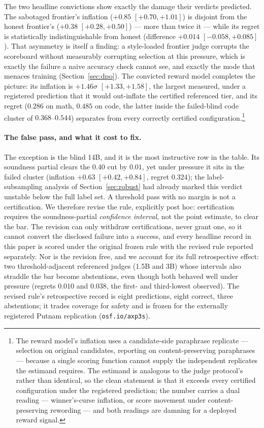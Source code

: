 \documentclass[11pt]{article}
\begin{document}
The two headline convictions show exactly the damage their verdicts predicted.
The sabotaged frontier's inflation ($+0.85$ $[+0.70, +1.01]$) is disjoint from the honest frontier's ($+0.38$ $[+0.28, +0.50]$) --- more than twice it --- while its regret is statistically indistinguishable from honest (difference $+0.014$ $[-0.058, +0.085]$).
That asymmetry is itself a finding: a style-loaded frontier judge corrupts the scoreboard without measurably corrupting selection at this pressure, which is exactly the failure a naive accuracy check cannot see, and exactly the mode that menaces training (Section~\ref{sec:dpo}).
The convicted reward model completes the picture: its inflation is $+1.46\sigma$ $[+1.33, +1.58]$, the largest measured, under a registered prediction that it would out-inflate the certified referenced tier, and its regret ($0.286$ on math, $0.485$ on code, the latter inside the failed-blind code cluster of $0.368$--$0.544$) separates from every correctly certified configuration.\footnote{The reward model's inflation uses a candidate-side paraphrase replicate --- selection on original candidates, reporting on content-preserving paraphrases --- because a single scoring function cannot supply the independent replicates the estimand requires. The estimand is analogous to the judge protocol's rather than identical, so the clean statement is that it exceeds every certified configuration under the registered prediction; the number carries a dual reading --- winner's-curse inflation, or score movement under content-preserving rewording --- and both readings are damning for a deployed reward signal.}

\paragraph{The false pass, and what it cost to fix.}
The exception is the blind 14B, and it is the most instructive row in the table.
Its soundness partial clears the $0.40$ cut by $0.01$, yet under pressure it sits in the failed cluster (inflation $+0.63$ $[+0.42, +0.84]$, regret $0.324$); the label-subsampling analysis of Section~\ref{sec:robust} had already marked this verdict unstable below the full label set.
A threshold pass with no margin is not a certification.
We therefore revise the rule, explicitly post hoc: certification requires the soundness-partial \emph{confidence interval}, not the point estimate, to clear the bar.
The revision can only withdraw certifications, never grant one, so it cannot convert the disclosed failure into a success, and every headline record in this paper is scored under the original frozen rule with the revised rule reported separately.
Nor is the revision free, and we account for its full retrospective effect: two threshold-adjacent referenced judges (1.5B and 3B) whose intervals also straddle the bar become abstentions, even though both behaved well under pressure (regrets $0.010$ and $0.038$, the first- and third-lowest observed).
The revised rule's retrospective record is eight predictions, eight correct, three abstentions; it trades coverage for safety and is frozen for the externally registered Putnam replication (\texttt{osf.io/axp3s}).
\end{document}
